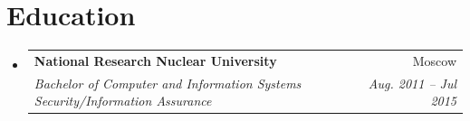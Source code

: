 \documentclass[letterpaper,11pt]{article}
\makeatletter
\newcommand{\resumeItem}[1]{
  \item\small{
    {#1 \vspace{-2pt}}
  }
}
\newcommand{\resumeSubheading}[4]{
  \vspace{-2pt}\item
    \begin{tabular*}{0.97\textwidth}[t]{l@{\extracolsep{\fill}}r}
      \textbf{#1} & #2 \\
      \textit{\small#3} & \textit{\small #4} \\
    \end{tabular*}\vspace{-7pt}
}
\newcommand{\resumeProjectHeading}[2]{
    \item
    \begin{tabular*}{0.97\textwidth}{l@{\extracolsep{\fill}}r}
      \small#1 & #2 \\
    \end{tabular*}\vspace{-7pt}
}
\newcommand{\resumeSubHeadingListStart}{\begin{itemize}[leftmargin=0.15in, label={}]}
\newcommand{\resumeSubHeadingListEnd}{\end{itemize}}
\newcommand{\resumeItemListStart}{\begin{itemize}}
\newcommand{\resumeItemListEnd}{\end{itemize}\vspace{-5pt}}
\makeatother
\begin{document}
\section{Education}
  \resumeSubHeadingListStart
    \resumeSubheading
      {National Research Nuclear University}{Moscow}
      {Bachelor of Computer and Information Systems Security/Information Assurance}{Aug. 2011 -- Jul 2015}
  \resumeSubHeadingListEnd






\end{document}
